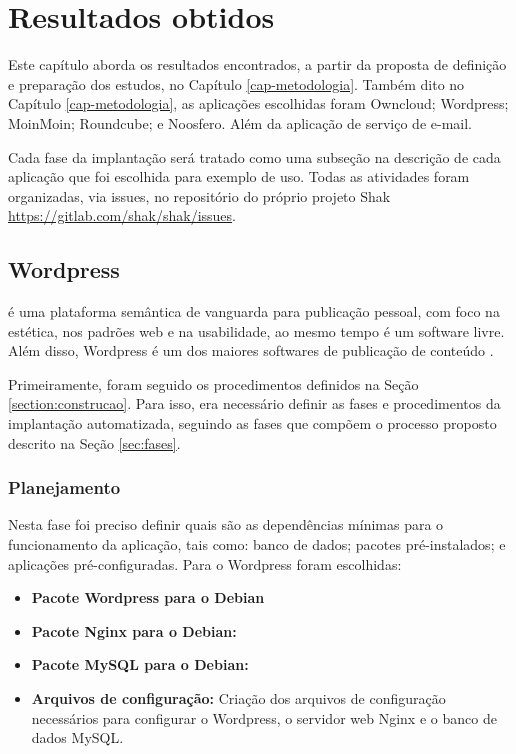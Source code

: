 \chapter{Resultados obtidos}
\label{cap-resultados}
Este capítulo aborda os resultados encontrados, a partir da proposta de
definição e preparação dos estudos, no Capítulo \ref{cap-metodologia}. Também dito 
no Capítulo \ref{cap-metodologia}, as aplicações escolhidas foram  
Owncloud; Wordpress; MoinMoin; Roundcube; e Noosfero. Além da aplicação de serviço
de e-mail.
 
Cada fase da implantação será tratado como uma 
subseção na descrição de cada aplicação que foi escolhida para exemplo de uso. 
Todas as atividades foram organizadas,
via issues, no repositório do próprio projeto Shak 
\url{https://gitlab.com/shak/shak/issues}.

\section{Wordpress}
\label{sub:wordpress}

 é uma plataforma semântica de vanguarda para publicação pessoal, 
com foco na estética, nos padrões web e na usabilidade, ao mesmo tempo é 
um software livre. Além disso, Wordpress é um dos maiores softwares de 
publicação de conteúdo . 

Primeiramente, foram seguido os procedimentos definidos na Seção 
\ref{section:construcao}. Para isso, era
necessário definir as fases e procedimentos da implantação automatizada,
seguindo as fases que compõem o processo proposto descrito na Seção \ref{sec:fases}.

\subsection{Planejamento}

Nesta fase foi preciso definir quais são as dependências mínimas
para o funcionamento da aplicação, tais como: banco de dados; pacotes
pré-instalados; e aplicações pré-configuradas. Para o Wordpress foram escolhidas:

\begin{itemize}
   \item \textbf{Pacote Wordpress para o Debian} 
   \item \textbf{Pacote Nginx para o Debian:} 
   \item \textbf{Pacote MySQL para o Debian:}
   \item \textbf{Arquivos de configuração:} Criação dos arquivos de configuração
   necessários para configurar o Wordpress, o servidor web Nginx e o banco de dados
   MySQL.
\end{itemize}

